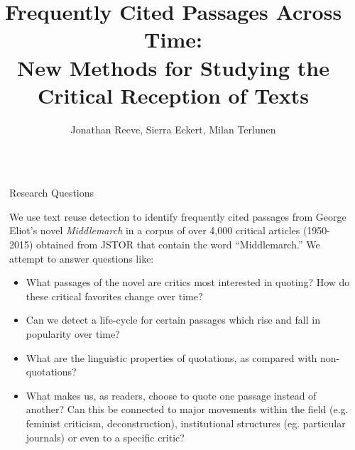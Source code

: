 \documentclass[final]{beamer}
\title{Frequently Cited Passages Across Time: \\ New
Methods for Studying the Critical Reception of
Texts} %
\author{Jonathan Reeve, Sierra Eckert, Milan Terlunen} %
\institute{Department of English and Comparative Literature, Columbia University} %
\newlength{\sepwid}
\newlength{\onecolwid}
\begin{document}

\setlength{\belowcaptionskip}{2ex} %
\setlength\belowdisplayshortskip{2ex} %

\begin{frame}[t] %

\begin{columns}[t] %

\begin{column}{\sepwid}\end{column} %

\begin{column}{\onecolwid} %


\begin{alertblock}{Research Questions}

We use text reuse detection to identify frequently cited passages from George Eliot's novel \emph{Middlemarch} in a corpus of over 4,000 critical articles (1950-2015) obtained from JSTOR that contain the word ``Middlemarch.'' We attempt to answer questions like: 

\begin{itemize}
\item What passages of the novel are critics most interested in quoting? How do these critical favorites change over time?  
\item Can we detect a life-cycle for certain passages which rise and fall in popularity over time?
\item What are the linguistic properties of quotations, as compared with non-quotations?
\item What makes us, as readers, choose to quote one passage instead of another? Can this be connected to major movements within the field (e.g. feminist criticism, deconstruction), institutional structures (eg. particular journals) or even to a specific critic?
\end{itemize}


\end{alertblock}
\end{column}
\end{columns}
\end{frame}
\end{document}
